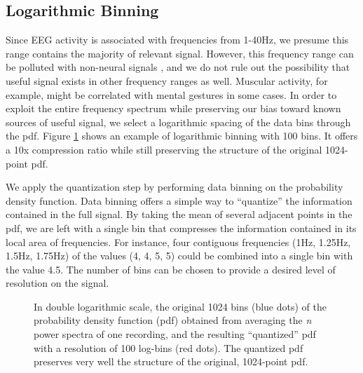 \subsection{Logarithmic Binning}

Since EEG activity is associated with frequencies from 1-40Hz, we presume this range contains the majority of relevant signal. However, this frequency range can be polluted with non-neural signals \cite{ball2009signal}, and we do not rule out the possibility that useful signal exists in other frequency ranges as well. Muscular activity, for example, might be correlated with mental gestures in some cases. In order to exploit the entire frequency spectrum while preserving our bias toward known sources of useful signal, we select a logarithmic spacing of the data bins through the pdf. Figure \ref{binnedEEGpowerspec} shows an example of logarithmic binning with 100 bins. It offers a 10x compression ratio while still preserving the structure of the original 1024-point pdf.

We apply the quantization step by performing data binning on the probability density function. Data binning offers a simple way to ``quantize'' the information contained in the full signal. By taking the mean of several adjacent points in the pdf, we are left with a single bin that compresses the information contained in its local area of frequencies. For instance, four contiguous frequencies (1Hz, 1.25Hz, 1.5Hz, 1.75Hz) of the values (4, 4, 5, 5) could be combined into a single bin with the value 4.5. The number of bins can be chosen to provide a desired level of  resolution on the signal.


\begin{figure}[!h]
  \vspace{-0.2cm}
  \centering
  {}
\caption{In double logarithmic scale, the original 1024 bins (blue dots) of the probability density function (pdf) obtained from averaging the \emph{n} power spectra of one recording, and the resulting ``quantized''  pdf with a resolution of 100 log-bins (red dots). The quantized pdf preserves very well the structure of the original, 1024-point pdf. }
\label{binnedEEGpowerspec}
\vspace{-0.1cm}
\end{figure}


